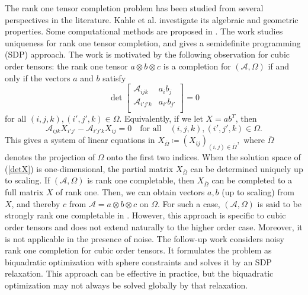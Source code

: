 \documentclass{amsart}
\newcommand{\reff}[1]{(\ref{#1})}
\newcommand{\mc}[1]{\mathcal{#1}}
\newcommand{\be}{\begin{equation}}
\newcommand{\ee}{\end{equation}}
\newcommand{\bbm}{\begin{bmatrix}}
\newcommand{\ebm}{\end{bmatrix}}
\theoremstyle{definition}
\numberwithin{equation}{section}
\begin{document}
The rank one tensor completion problem has been studied from several perspectives in the literature.
Kahle et al. \cite{kahle17} investigate its algebraic and geometric properties.
Some computational methods are proposed in \cite{cifuentes25,nie25,Singh20,zhou25}.
The work \cite{Singh20} studies uniqueness for rank one tensor completion,
and \cite{cifuentes25} gives a semidefinite programming (SDP) approach.
The work \cite{zhou25} is motivated by the following observation for cubic order tensors:
the rank one tensor $a \otimes b \otimes c$ is a completion for $(\mc{A}, \Omega)$ 
if and only if the vectors $a$ and $b$ satisfy
\be\label{det}
\det \bbm 
\mc{A}_{ijk} & a_ib_j \\
\mc{A}_{i'j'k} & a_{i'}b_{j'} \\
\ebm = 0
\ee
for all $(i,j,k), (i',j',k) \in \Omega$.
Equivalently, if we let $X = ab^T$, then 
\be\label{detX}
\mc{A}_{ijk} X_{i'j'} - \mc{A}_{i'j'k} X_{ij} = 0
\quad \text{for all} \quad (i,j,k), (i',j',k) \in \Omega.
\ee
This gives a system of linear equations in
$
X_{\bar{\Omega}} \coloneqq (X_{ij})_{(i,j) \in \bar{\Omega}},
$
where $\bar{\Omega}$ denotes the projection of $\Omega$ onto the first two indices.
When the solution space of \reff{detX} is one-dimensional, 
the partial matrix $X_{\bar{\Omega}}$ can be determined uniquely up to scaling.
If $(\mc{A}, \Omega)$ is rank one completable, 
then $X_{\bar{\Omega}}$ can be completed to a full matrix $X$ of rank one.
Then, we can obtain vectors $a, b$ (up to scaling) from $X$,
and thereby $c$ from $\mc{A} = a \otimes b \otimes c$ on $\Omega$.
For such a case, $(\mc{A}, \Omega)$ is said to be strongly rank one completable in \cite{zhou25}.
However, this approach is specific to cubic order tensors 
and does not extend naturally to the higher order case.
Moreover, it is not applicable in the presence of noise.
The follow-up work \cite{nie25} considers noisy rank one completion for cubic order tensors.
It formulates the problem as biquadratic optimization with sphere constraints and solves it by an SDP relaxation.
This approach can be effective in practice, 
but the biquadratic optimization may not always be solved globally by that relaxation.
\end{document}
